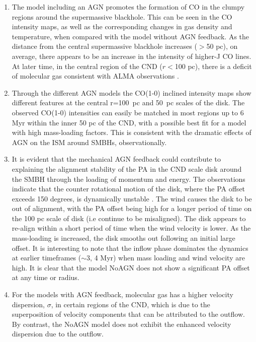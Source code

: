 \documentclass[fleqn,usenatbib]{mnras}
\begin{document}
	\begin{enumerate}
	  \item 
         The model including an AGN promotes the formation of CO in the clumpy regions around the supermassive blackhole. This can be seen in the CO intensity maps, 
         as well as the corresponding changes in gas density and temperature, when compared with the model without AGN feedback. As the distance from the central supermassive blackhole increases ($>$50 pc), on average, there appears to be an increase in the intensity of higher-J CO lines.
         At later time, in the central region of the CND ($r<$100 pc), there is a deficit of molecular gas consistent with ALMA observations \citet{Garcia-Burillo2019}.

         \item
        Through the different AGN models the CO(1-0) inclined intensity maps show different features at the central r=100~pc and 50~pc scales of the disk. 
        The observed CO(1-0) intensities can easily be matched in most regions up to 6 Myr within the inner 50 pc of the CND, with a possible best fit for a model with high mass-loading factors. This is consistent with the dramatic effects of AGN on the ISM around SMBHs, observationally. 
	\item
        It is evident that the mechanical AGN feedback could contribute to explaining the alignment stability of the PA in the CND scale disk around the SMBH through the loading of momentum and energy. The observations indicate that the counter rotational motion of the disk, where the PA offset exceeds 150 degrees, is dynamically unstable \citep{Garcia-Burillo2019}.
        The wind causes the disk to be out of alignment, with the PA offset being high for a longer period of time on the 100 pc scale of disk (i.e continue to be misaligned). The disk appears to re-align within a short period of time when the wind velocity is lower. As the mass-loading is increased, the disk smooths out following an initial large offset. It is interesting to note that the inflow phase dominates the dynamics at earlier timeframes ($\sim$3, 4 Myr) when mass loading and wind velocity are high. It is clear that the model NoAGN does not show a significant PA offset at any time or radius. 
	
       \item  
        For the models with AGN feedback, molecular gas has a higher velocity dispersion, $\sigma$, in certain regions of the CND, which is due to the superposition of velocity components that can be attributed to the outflow.
        By contrast, the NoAGN model does not exhibit the enhanced velocity dispersion due to the outflow.    


\end{enumerate}
\end{document}
